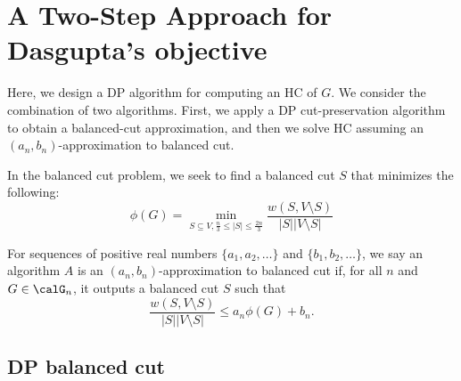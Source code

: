 \section{A Two-Step Approach for Dasgupta's objective}
Here, we design a DP algorithm for computing an HC of $G$. We consider the combination of two algorithms. First, we apply a DP cut-preservation algorithm to obtain a balanced-cut approximation, and then we solve HC assuming an $(a_n, b_n)$-approximation to balanced cut.

In the balanced cut problem, we seek to find a balanced cut $S$ that minimizes the following:
\[
    \phi(G) = \min_{S \subseteq V, \frac{n}{3} \leq |S| \leq \frac{2n}{3}} \frac{w(S,V \setminus S)}{|S||V \setminus S|} 
\]

\begin{defn}
For sequences of positive real numbers $\{a_1, a_2, \ldots\}$ and $\{b_1, b_2, \ldots \}$, 
we say an algorithm $A$ is an $(a_n, b_n)$-approximation to balanced cut if, for all $n$ and $G \in \calG_n$, it outputs a balanced cut $S$ such that 
\[
    \frac{w(S, V \setminus S)}{|S||V \setminus S|} \leq a_n \phi(G) + b_n.
\]
\end{defn}

\subsection{DP balanced cut}

